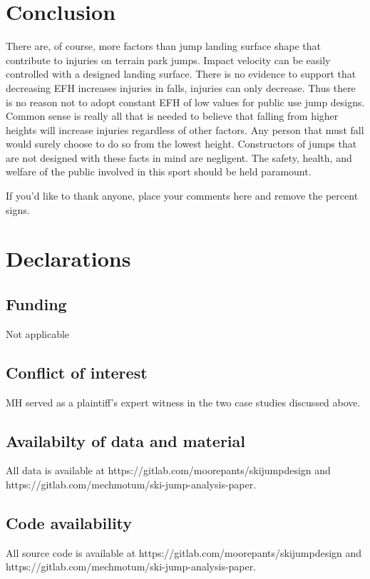 \documentclass[smallextended]{svjour3}       %
\begin{document}
\section{Conclusion}
\label{sec:conc}
%
There are, of course, more factors than jump landing surface shape that
contribute to injuries on terrain park jumps. Impact velocity can be easily
controlled with a designed landing surface. There is no evidence to support
that decreasing EFH increases injuries in falls,  injuries can only decrease.
Thus there is no reason not to adopt constant EFH of low values for public use
jump designs.  Common sense is really all that is needed to believe that
falling from higher heights will increase injuries regardless of other factors.
Any person that must fall would surely choose to do so from the lowest height.
Constructors of jumps that are not designed with these facts in mind are
negligent. The safety, health, and welfare of the public involved in this sport
should be held paramount.

\begin{acknowledgements}
If you'd like to thank anyone, place your comments here
and remove the percent signs.
\end{acknowledgements}

\section*{Declarations}
%
\subsection*{Funding}
%
Not applicable
\subsection*{Conflict of interest}
\label{sec:conflict}
%
MH served as a plaintiff's expert witness in the two case studies discussed above.
\subsection*{Availabilty of data and material}
All data is available at https://gitlab.com/moorepants/skijumpdesign and
https://gitlab.com/mechmotum/ski-jump-analysis-paper.
\subsection*{Code availability}
All source code is available at https://gitlab.com/moorepants/skijumpdesign and
https://gitlab.com/mechmotum/ski-jump-analysis-paper.
\end{document}
